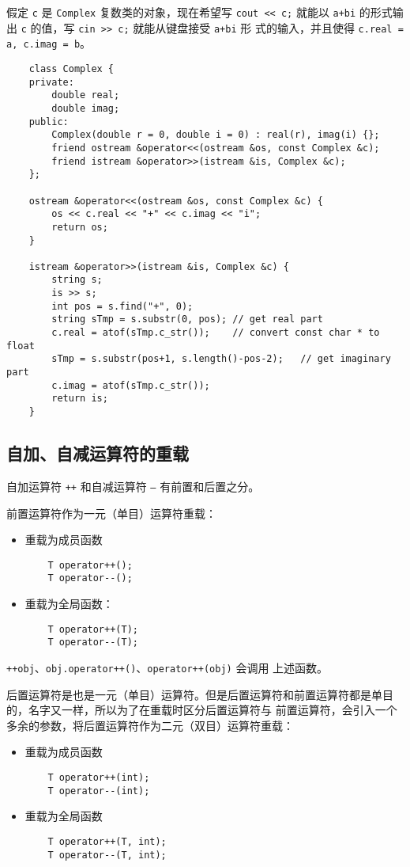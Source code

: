 \documentclass[UTF8]{ctexart}
\begin{document}
假定 \texttt{c} 是 \texttt{Complex} 复数类的对象，现在希望写 \texttt{cout << c;} 就能以
\texttt{a+bi} 的形式输出 \texttt{c} 的值，写 \texttt{cin >> c;} 就能从键盘接受 \texttt{a+bi} 形
式的输入，并且使得 \texttt{c.real = a, c.imag = b}。
\begin{verbatim}
    class Complex {
    private:
        double real;
        double imag;
    public:
        Complex(double r = 0, double i = 0) : real(r), imag(i) {};
        friend ostream &operator<<(ostream &os, const Complex &c);
        friend istream &operator>>(istream &is, Complex &c);
    };

    ostream &operator<<(ostream &os, const Complex &c) {
        os << c.real << "+" << c.imag << "i";
        return os;
    }

    istream &operator>>(istream &is, Complex &c) {
        string s;
        is >> s;
        int pos = s.find("+", 0);
        string sTmp = s.substr(0, pos); // get real part
        c.real = atof(sTmp.c_str());    // convert const char * to float
        sTmp = s.substr(pos+1, s.length()-pos-2);   // get imaginary part
        c.imag = atof(sTmp.c_str());
        return is;
    }
\end{verbatim}

\subsection{自加、自减运算符的重载}
自加运算符 \texttt{++} 和自减运算符 \texttt{--} 有前置和后置之分。

前置运算符作为一元（单目）运算符重载：
\begin{itemize}
    \item 重载为成员函数
    \begin{verbatim}
    T operator++();
    T operator--();
    \end{verbatim}
    \item 重载为全局函数：
    \begin{verbatim}
    T operator++(T);
    T operator--(T);
    \end{verbatim}
\end{itemize}

\texttt{++obj}、\texttt{obj.operator++()}、\texttt{operator++(obj)} 会调用
上述函数。

后置运算符是也是一元（单目）运算符。但是后置运算符和前置运算符都是单目的，名字又一样，所以为了在重载时区分后置运算符与
前置运算符，会引入一个多余的参数，将后置运算符作为二元（双目）运算符重载：
\begin{itemize}
    \item 重载为成员函数
    \begin{verbatim}
    T operator++(int);
    T operator--(int);
    \end{verbatim}
    \item 重载为全局函数
    \begin{verbatim}
    T operator++(T, int);
    T operator--(T, int);
    \end{verbatim}
\end{itemize}
\end{document}
